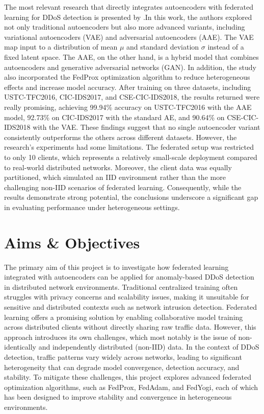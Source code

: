 The most relevant research that directly integrates autoencoders with federated learning for DDoS detection is presented by \cite{IDRISSI2023121000}.In this work, the authors explored not only traditional autoencoders but also more advanced variants, including variational autoencoders (VAE) and adversarial autoencoders (AAE). The VAE map input to a distribution of mean $\mu$ and standard deviation $\sigma$ instead of a fixed latent space. The AAE, on the other hand, is a hybrid model that combines autoencoders and generative adversarial networks (GAN). In addition, the study also incorporated the FedProx optimization algorithm to reduce heterogeneous effects and increase model accuracy. After training on three datasets, including USTC-TFC2016, CIC-IDS2017, and CSE-CIC-IDS2018, the results returned were really promising, achieving 99.94\% accuracy on USTC-TFC2016 with the AAE model, 92.73\% on CIC-IDS2017 with the standard AE, and 90.64\% on CSE-CIC-IDS2018 with the VAE. These findings suggest that no single autoencoder variant consistently outperforms the others across different datasets. However, the research's experiments had some limitations. The federated setup was restricted to only 10 clients, which represents a relatively small-scale deployment compared to real-world distributed networks. Moreover, the client data was equally partitioned, which simulated an IID environment rather than the more challenging non-IID scenarios of federated learning. Consequently, while the results demonstrate strong potential, the conclusions underscore a significant gap in evaluating performance under heterogeneous settings.

\section{Aims \& Objectives}

The primary aim of this project is to investigate how federated learning integrated with autoencoders can be applied for anomaly-based DDoS detection in distributed network environments. Traditional centralized training often struggles with privacy concerns and scalability issues, making it unsuitable for sensitive and distributed contexts such as network intrusion detection. Federated learning offers a promising solution by enabling collaborative model training across distributed clients without directly sharing raw traffic data. However, this approach introduces its own challenges, which most notably is the issue of non-identically and independently distributed (non-IID) data. In the context of DDoS detection, traffic patterns vary widely across networks, leading to significant heterogeneity that can degrade model convergence, detection accuracy, and stability. To mitigate these challenges, this project explores advanced federated optimization algorithms, such as FedProx, FedAdam, and FedYogi, each of which has been designed to improve stability and convergence in heterogeneous environments.

